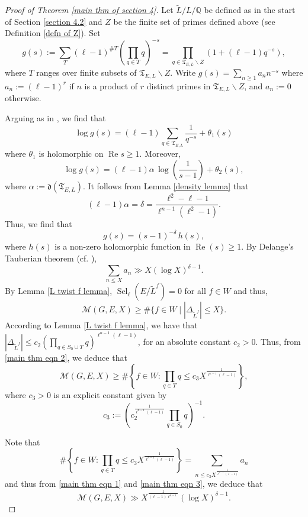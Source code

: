 \documentclass[11pt,reqno]{amsart}
\newcommand{\Q}{\mathbb{Q}}
\newcommand{\op}[1]{\operatorname{#1}}
\numberwithin{equation}{section}
\begin{document}
\begin{proof}[Proof of Theorem \ref{main thm of section 4}]
 Let $\widetilde{L}/L/\Q$ be defined as in the start of Section \ref{section 4.2} and $Z$ be the finite set of primes defined above (see Definition \ref{defn of Z}). Set
 \[g(s):=\sum_{T} (\ell-1)^{\# T}\left(\prod_{q\in T} q\right)^{-s}=\prod_{q\in \mathfrak{T}_{E,L}\backslash Z} \left(1+(\ell-1)q^{-s}\right),\]
 where $T$ ranges over finite subsets of $\mathfrak{T}_{E,L}\backslash Z$. Write $g(s)=\sum_{n\geq 1} a_n n^{-s}$ where $a_n:=(\ell-1)^r$ if $n$ is a product of $r$ distinct primes in $\mathfrak{T}_{E, L}\backslash Z$, and $a_n:=0$ otherwise. 
 
 \par Arguing as in \cite[Theorem 2.4, p.5]{serredivisibilite}, we find that
\[\log g(s)=(\ell-1)\sum_{q\in \mathfrak{T}_{E,L}} \frac{1}{q^{-s}}+\theta_1(s)\] where $\theta_1$ is holomorphic on $\op{Re}s \geq 1$. Moreover, \[\log g(s) = (\ell-1) \alpha \, \log\left(\frac{1}{s-1}\right)+\theta_2(s), \]
where $\alpha:=\mathfrak{d}(\mathfrak{T}_{E,L})$. It follows from Lemma \ref{density lemma} that 
\[(\ell-1)\alpha=\delta=\frac{\ell^2 - \ell - 1}{\ell^{n-1}(\ell^2-1)}.\]
Thus, we find that 
\[g(s)=(s-1)^{- \delta} \, h(s),\] where $h(s)$ is a non-zero holomorphic function in $\op{Re}(s)\geq 1$. By Delange's Tauberian theorem (cf. \cite[Theorem 7.28]{Tenenbaum}), 
\begin{equation}\label{main thm eqn 1}\sum_{n\leq X} a_n \gg  X(\log X)^{\delta-1}.\end{equation}
By Lemma \ref{L twist f lemma}, $\op{Sel}_\ell(E/\widetilde{L}^f)=0$ for all $f\in W$ and thus,\begin{equation}\label{main thm eqn 2}
     \mathcal{M}(G, E, X)\geq \#\{f\in W\mid |\Delta_{\widetilde{L}^f}|\leq X\}.
 \end{equation}
 \noindent According to Lemma \ref{L twist f lemma}, we have that $ |\Delta_{\widetilde{L}^f}|\leq c_2\left(\prod_{q\in S_0\cup T} q\right)^{\ell^{n-1}(\ell-1)}$, for an absolute constant $c_2>0$. Thus, from \eqref{main thm eqn 2}, we deduce that
 \begin{equation}\label{main thm eqn 3}
     \mathcal{M}(G, E, X)\geq \#\left\{f\in W: \prod_{q\in T} q\leq c_3 X^{\frac{1}{\ell^{n-1}(\ell-1)}}\right\},
 \end{equation}
 where $c_3>0$ is an explicit constant given by 
\[c_3:=\left(c_2^{\frac{1}{\ell^{n-1}(\ell-1)}} \prod_{q\in S_0} q\right)^{-1}.\]

Note that 
\begin{equation}\#\left\{f\in W: \prod_{q\in T} q\leq c_3 X^{\frac{1}{\ell^{n-1}(\ell-1)}}\right\}= \sum_{n\leq c_3 X^{\frac{1}{\ell^{n-1}(\ell-1)}}} a_n\end{equation}
and thus from \eqref{main thm eqn 1} and \eqref{main thm eqn 3}, we deduce that 
 \[\mathcal{M}(G, E, X)\gg X^{\frac{1}{(\ell-1)\ell^{n-1}}}(\log X)^{\delta-1}.\]
 \end{proof}
    



\end{document}
